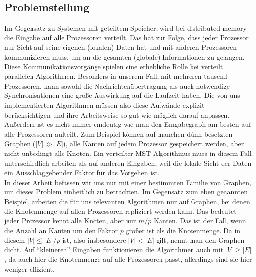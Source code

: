 \subsection{Problemstellung}
Im Gegensatz zu Systemen mit geteiltem Speicher, wird bei distributed-memory  die Eingabe auf alle Prozessoren verteilt.
Das hat zur Folge, dass jeder Prozessor nur Sicht auf seine eigenen (lokalen) Daten hat und mit anderen Prozessoren kommunizieren muss, um an die gesamten (globale) Informationen zu gelangen. Diese Kommunikationsvorgänge spielen eine erhebliche Rolle bei verteilt parallelen Algorithmen. Besonders in unserem Fall, mit mehreren tausend Prozessoren, kann sowohl die Nachrichtenübertragung als auch notwendige Synchronisationen eine große Auswirkung auf die Laufzeit haben. Die von uns implementierten Algorithmen müssen also diese Aufwände explizit berücksichtigen und ihre Arbeitsweise so gut wie möglich darauf anpassen.\\
Außerdem ist es nicht immer eindeutig wie man den Eingabegraph am besten auf alle Prozessoren aufteilt. Zum Beispiel können auf manchen dünn besetzten Graphen ($|V| \gg |E|$), alle Kanten auf jedem Prozessor gespeichert werden, aber nicht unbedingt alle Knoten. 
Ein verteilter MST Algorithmus muss in diesem Fall unterschiedlich arbeiten als auf anderen Eingaben, weil die lokale Sicht der Daten ein Ausschlaggebender Faktor für das Vorgehen ist.\\
In dieser Arbeit befassen wir uns nur mit einer bestimmten Familie von Graphen, um dieses Problem einheitlich zu betrachten. Im Gegensatz zum eben genannten Beispiel, arbeiten die für uns relevanten Algorithmen nur auf Graphen, bei denen die Knotenmenge auf allen Prozessoren repliziert werden kann. Das bedeutet jeder Prozessor kennt alle Knoten, aber nur $m/p$ Kanten. Das ist der Fall, wenn die Anzahl an Kanten um den Faktor $p$ größer ist als die Knotenmenge. Da in diesem $|V| \leq |E| / p$ ist, also insbesondere $|V| < |E|$ gilt, nennt man den Graphen dicht.
Auf \enquote{kleineren} Eingaben funktionieren die Algorithmen auch mit $|V| \geq |E|$, da auch hier die Knotenmenge auf alle Prozessoren passt, allerdings sind sie hier weniger effizient.

